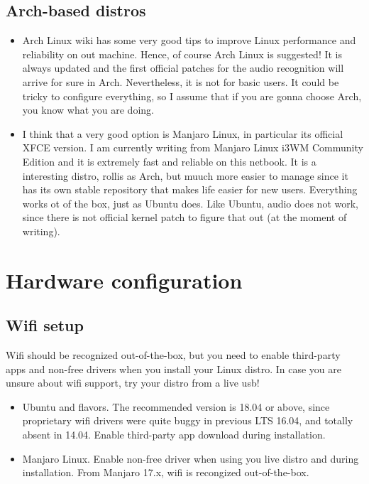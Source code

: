 \documentclass{article}
\begin{document}
\subsection{Arch-based distros}
\begin{itemize}
	\item Arch Linux wiki has some very good tips to improve Linux performance and reliability on out machine. Hence, of course Arch Linux is suggested! It is always updated and the first official patches for the audio recognition will arrive for sure in Arch. Nevertheless, it is not for basic users. It could be tricky to configure everything, so I assume that if you are gonna choose Arch, you know what you are doing.
	\item I think that a very good option is Manjaro Linux, in particular its official XFCE version. I am currently writing from Manjaro Linux i3WM Community Edition and it is extremely fast and reliable on this netbook. It is a interesting distro, rollis as Arch, but muuch more easier to manage since it has its own stable repository that makes life easier for new users. Everything works ot of the box, just as Ubuntu does. Like Ubuntu, audio does not work, since there is not official kernel patch to figure that out (at the moment of writing).
\end{itemize}


\section{Hardware configuration}

\subsection{Wifi setup}
Wifi should be recognized out-of-the-box, but you need to enable third-party apps and non-free drivers when you install your Linux distro. In case you are unsure about wifi support, try your distro from a live usb!
\begin{itemize}
	\item Ubuntu and flavors. The recommended version is 18.04 or above, since proprietary wifi drivers were quite buggy in previous LTS 16.04, and totally absent in 14.04. Enable third-party app download during installation.
	\item Manjaro Linux. Enable non-free driver when using you live distro and during installation. From Manjaro 17.x, wifi is recongized out-of-the-box.
\end{itemize}
\end{document}
